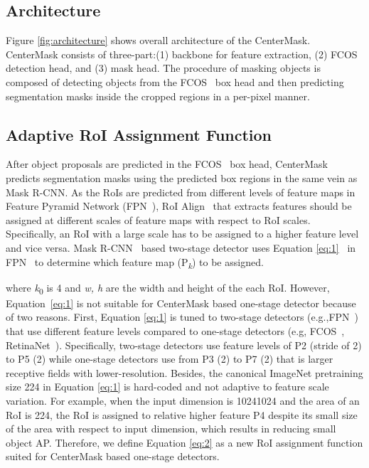 \documentclass[10pt,twocolumn,letterpaper]{article}
\begin{document}
\subsection{Architecture}
Figure \ref{fig:architecture} shows overall architecture of the  CenterMask. 
CenterMask consists of three-part:(1) backbone for feature extraction, (2) FCOS~\cite{Tian_2019_ICCV} detection head, and (3) mask head.
The procedure of masking objects is composed of detecting objects from the FCOS~\cite{Tian_2019_ICCV} box head and then predicting segmentation masks inside the cropped regions in a per-pixel manner.


\subsection{Adaptive RoI Assignment Function}\label{sec:3.2}
After object proposals are predicted in the FCOS~\cite{Tian_2019_ICCV} box head, CenterMask predicts segmentation masks using the predicted box regions in the same vein as Mask R-CNN.
As the RoIs are predicted from different levels of feature maps in Feature Pyramid Network (FPN~\cite{lin2017feature}), RoI Align~\cite{he2017mask} that extracts features should be assigned at different scales of feature maps with respect to RoI scales.
Specifically, an RoI with a large scale has to be assigned to a higher feature level and vice versa.
Mask R-CNN~\cite{he2017mask} based two-stage detector uses Equation \ref{eq:1}~ in FPN~\cite{lin2017feature} to determine which feature map (P\textsubscript{\textit{k}}) to be assigned.



\noindent
where \textit{k}\textsubscript{0} is 4 and \textit{w, h} are the width and height of the each RoI.
However, Equation~\ref{eq:1} is not suitable for CenterMask based one-stage detector because of two reasons.
First, Equation \ref{eq:1} is tuned to two-stage detectors (e.g.,FPN~\cite{lin2017feature}) that use different feature levels compared to one-stage detectors (e.g, FCOS~\cite{Tian_2019_ICCV}, RetinaNet~\cite{lin2018focal}).
Specifically, two-stage detectors use feature levels of P2 (stride of 2) to P5 (2) while one-stage detectors use from P3 (2) to P7 (2) that is larger receptive fields with lower-resolution.
Besides, the canonical ImageNet pretraining size 224 in Equation \ref{eq:1} is hard-coded and not adaptive to feature scale variation.
For example, when the input dimension is 10241024 and the area of an RoI is 224, the RoI is assigned to relative higher feature P4 despite its small size of the area with respect to input dimension, which results in reducing small object AP.
Therefore, we define Equation \ref{eq:2} as a new RoI assignment function suited for CenterMask based one-stage detectors.
\end{document}
